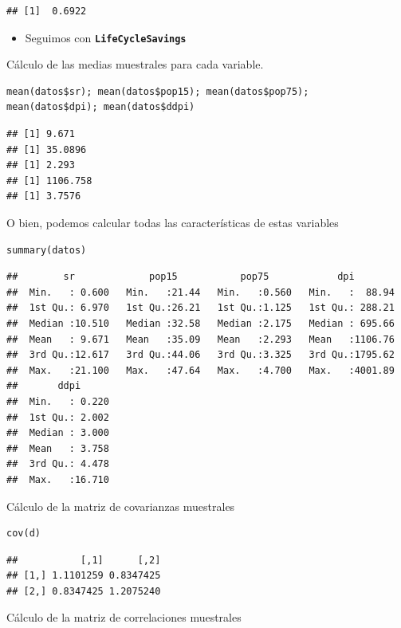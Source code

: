 \begin{verbatim}
## [1]  0.6922
\end{verbatim}
\begin{itemize}[label=\color{red}\textbullet, leftmargin=*]
	\item \color{lightblue}Seguimos con \textbf{\texttt{LifeCycleSavings}}
\end{itemize}

Cálculo de las medias muestrales para cada variable.

\begin{lstlisting}
mean(datos$sr); mean(datos$pop15); mean(datos$pop75);  mean(datos$dpi); mean(datos$ddpi)
\end{lstlisting}

\begin{verbatim}
## [1] 9.671
## [1] 35.0896
## [1] 2.293
## [1] 1106.758
## [1] 3.7576
\end{verbatim}

O bien, podemos calcular todas las características de estas variables

\begin{lstlisting}
summary(datos)
\end{lstlisting}

\begin{verbatim}
##        sr             pop15           pop75            dpi         
##  Min.   : 0.600   Min.   :21.44   Min.   :0.560   Min.   :  88.94  
##  1st Qu.: 6.970   1st Qu.:26.21   1st Qu.:1.125   1st Qu.: 288.21  
##  Median :10.510   Median :32.58   Median :2.175   Median : 695.66  
##  Mean   : 9.671   Mean   :35.09   Mean   :2.293   Mean   :1106.76  
##  3rd Qu.:12.617   3rd Qu.:44.06   3rd Qu.:3.325   3rd Qu.:1795.62  
##  Max.   :21.100   Max.   :47.64   Max.   :4.700   Max.   :4001.89  
##       ddpi       
##  Min.   : 0.220  
##  1st Qu.: 2.002  
##  Median : 3.000  
##  Mean   : 3.758  
##  3rd Qu.: 4.478  
##  Max.   :16.710
\end{verbatim}

Cálculo de la matriz de covarianzas muestrales

\begin{lstlisting}
cov(d)
\end{lstlisting}

\begin{verbatim}
##           [,1]      [,2]
## [1,] 1.1101259 0.8347425
## [2,] 0.8347425 1.2075240
\end{verbatim}

Cálculo de la matriz de correlaciones muestrales

